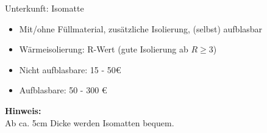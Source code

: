 \documentclass{beamer}
\newcommand{\tipp}[2][Tipp]{\vspace{0.2cm}\textbf{#1:}\\#2}
\begin{document}
			
			\begin{frame}{Unterkunft: Isomatte}
				\begin{itemize}
					\item Mit/ohne Füllmaterial, zusätzliche Isolierung, (selbst) aufblasbar
					\item Wärmeisolierung: R-Wert (gute Isolierung ab $R \geq 3$)
					\item Nicht aufblasbare: 15 - 50€
					\item Aufblasbare: 50 - 300 €
				\end{itemize}\pause
				\tipp[Hinweis]{Ab ca. 5cm Dicke werden Isomatten bequem.}
			\end{frame}
			
			
\end{document}
